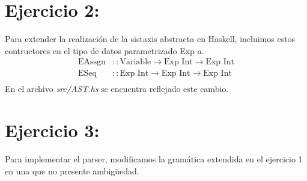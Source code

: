 \documentclass[11pt, fleqn]{article}
\begin{document}

\section*{Ejercicio 2:}
Para extender la realización de la sistaxis abstracta en Haskell, incluimos
estos contructores en el tipo de datos parametrizado Exp $a$. 
\begin{align*}
      \text{EAssgn} &:: \text{Variable} \rightarrow \text{Exp Int} \rightarrow \text{Exp Int} \\
      \text{ESeq} &:: \text{Exp Int} \rightarrow \text{Exp Int} \rightarrow \text{Exp Int} \\
\end{align*}
En el archivo \emph{src/AST.hs} se encuentra reflejado este cambio.


\section*{Ejercicio 3:}
Para implementar el parser, modificamos la gramática extendida en el ejercicio 1
en una que no presente ambigüedad.
\end{document}
